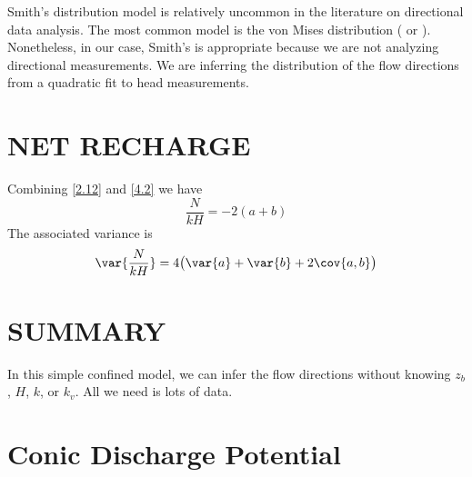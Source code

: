\documentclass[12pt]{article}
\begin{document}
Smith's distribution model is relatively uncommon in the literature on directional data analysis. The most common model is the von Mises distribution (\citet{Mardia1972} or \citet{Watson1983}). Nonetheless, in our case, Smith's is appropriate because we are not analyzing directional measurements. We are inferring the distribution of the flow directions from a quadratic fit to head measurements.


\section{NET RECHARGE}
Combining \eqref{2.12} and \eqref{4.2} we have
%
\begin{equation}\label{101}
    \frac{N}{kH} = -2(a + b)
\end{equation}
%
The associated variance is
%
\begin{equation}\label{102}
    \var{\frac{N}{kH}} = 4 \big( \var{a} + \var{b} + 2 \cov{a, b} \big)
\end{equation}


\section{SUMMARY}
\vspace{0.2in}
\begin{tcolorbox}
{\Large In this simple confined model, we can infer the flow directions without knowing $z_b$, $H$, $k$, or $k_v$. All we need is lots of data.}
\end{tcolorbox}


\newpage




\newpage
\appendix

\section{Conic Discharge Potential}\label{7.1}
\end{document}
